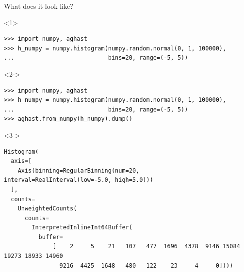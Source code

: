 \documentclass[aspectratio=169]{beamer}
\begin{document}
\begin{frame}[fragile]{What does it look like?}
\small
\begin{onlyenv}<1>
\begin{verbatim}
>>> import numpy, aghast
>>> h_numpy = numpy.histogram(numpy.random.normal(0, 1, 100000),
...                           bins=20, range=(-5, 5))

\end{verbatim}
\end{onlyenv}
\begin{onlyenv}<2->
\begin{verbatim}
>>> import numpy, aghast
>>> h_numpy = numpy.histogram(numpy.random.normal(0, 1, 100000),
...                           bins=20, range=(-5, 5))
>>> aghast.from_numpy(h_numpy).dump()
\end{verbatim}
\end{onlyenv}

\scriptsize
\begin{uncoverenv}<3->
\begin{verbatim}
Histogram(
  axis=[
    Axis(binning=RegularBinning(num=20, interval=RealInterval(low=-5.0, high=5.0)))
  ],
  counts=
    UnweightedCounts(
      counts=
        InterpretedInlineInt64Buffer(
          buffer=
              [    2     5    21   107   477  1696  4378  9146 15084 19273 18933 14960
                9216  4425  1648   480   122    23     4     0])))
\end{verbatim}
\end{uncoverenv}

\vspace{0.25 cm}
\end{frame}
\end{document}
